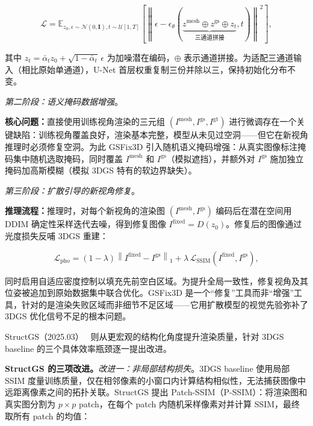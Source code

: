 \begin{equation}
\mathcal{L} = \mathbb{E}_{z_0, \epsilon \sim \mathcal{N}(0, \mathbf{I}), t \sim \mathcal{U}[1, T]} \left[ \left\| \epsilon - \epsilon_\theta(\underbrace{z^{\mathrm{mesh}} \oplus z^{\mathrm{gs}} \oplus z_t}_{\text{三通道拼接}}, t) \right\|^2 \right],
\end{equation}

其中 $z_t = \bar{\alpha}_t z_0 + \sqrt{1 - \bar{\alpha}_t}\,\epsilon$ 为加噪潜在编码，$\oplus$ 表示通道拼接。为适配三通道输入（相比原始单通道），U-Net 首层权重复制三份并除以三，保持初始化分布不变。

\textit{第二阶段：语义掩码数据增强}。

\textbf{核心问题：}直接使用训练视角渲染的三元组 $(I^{\mathrm{mesh}}, I^{\mathrm{gs}}, I^{\mathrm{gt}})$ 进行微调存在一个关键缺陷：训练视角覆盖良好，渲染基本完整，模型从未见过空洞——但它在新视角推理时必须修复空洞。为此 GSFix3D 引入随机语义掩码增强：从真实图像标注掩码集中随机选取掩码，同时覆盖 $I^{\mathrm{mesh}}$ 和 $I^{\mathrm{gs}}$（模拟遮挡），并额外对 $I^{\mathrm{gs}}$ 施加独立掩码加高斯模糊（模拟 3DGS 特有的软边界缺失）。

\textit{第三阶段：扩散引导的新视角修复}。

\textbf{推理流程：}推理时，对每个新视角的渲染图 $(I^{\mathrm{mesh}}, I^{\mathrm{gs}})$ 编码后在潜在空间用 DDIM 确定性采样迭代去噪，得到修复图像 $I^{\mathrm{fixed}} = D(z_0)$。修复后的图像通过光度损失反哺 3DGS 重建：

\begin{equation}
\mathcal{L}_{\mathrm{pho}} = (1 - \lambda) \left\| I^{\mathrm{fixed}} - I^{\mathrm{gs}} \right\|_1 + \lambda \, \mathcal{L}_{\mathrm{SSIM}}(I^{\mathrm{fixed}}, I^{\mathrm{gs}}),
\end{equation}

同时启用自适应密度控制以填充先前空白区域。为提升全局一致性，修复视角及其位姿被追加到原始数据集中联合优化。GSFix3D 是一个“修复”工具而非“增强”工具，针对的是渲染失败区域而非细节不足区域——它用扩散模型的视觉先验弥补了 3DGS 优化信号不足的根本问题。

StructGS（2025.03）~\cite{2503_06462} 则从更宏观的结构化角度提升渲染质量，针对 3DGS baseline 的三个具体效率瓶颈逐一提出改进。

\textbf{StructGS 的三项改进。}\textit{改进一：非局部结构损失}。3DGS baseline 使用局部 SSIM 度量训练质量，仅在相邻像素的小窗口内计算结构相似性，无法捕获图像中远距离像素之间的拓扑关联。StructGS 提出 Patch-SSIM（P-SSIM）：将渲染图和真实图分割为 $p \times p$ patch，在每个 patch 内随机采样像素对并计算 SSIM，最终取所有 patch 的均值：

